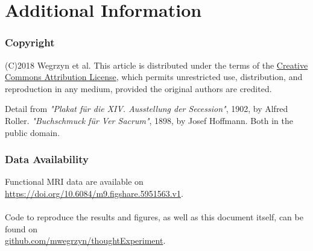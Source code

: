 \documentclass[fleqn,10pt]{SelfArx} %
\begin{document}

\section*{Additional Information}

\subsubsection*{Copyright}
(C)2018 Wegrzyn et al. This article is distributed under the terms of the \href{http://creativecommons.org/licenses/by/4.0/}{Creative Commons Attribution License}, which permits unrestricted use, distribution, and reproduction in any medium, provided the original authors are credited.  

Detail from \textit{"Plakat für die XIV. Ausstellung der Secession"}, 1902, by Alfred Roller. \textit{"Buchschmuck für Ver Sacrum"}, 1898, by Josef Hoffmann. Both in the public domain.

\subsubsection*{Data Availability} Functional MRI data are available on  \\
\href{https://doi.org/10.6084/m9.figshare.5951563.v1}{https://doi.org/10.6084/m9.figshare.5951563.v1}.  \\
\\
Code to reproduce the results and figures, as well as this document itself, can be found on  \\
\href{https://github.com/mwegrzyn/thoughtExperiment}{github.com/mwegrzyn/thoughtExperiment}.  




\renewcommand*{\bibfont}{\footnotesize}



\end{document}
